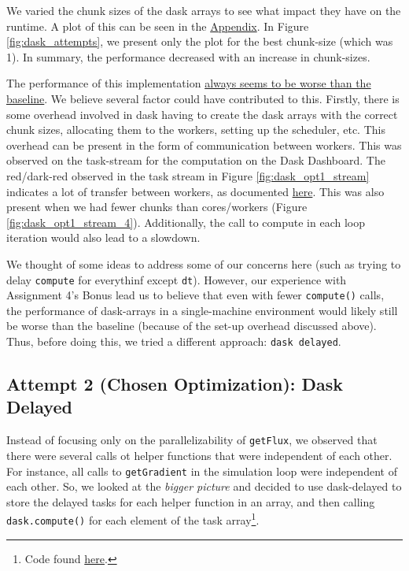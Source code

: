 \documentclass[a4paper,10pt]{article}
\begin{document}
We varied the chunk sizes of the dask arrays to see what impact they have on the runtime.
A plot of this can be seen in the \hyperref[fig:dask_opt1_chunk_size]{Appendix}.
In Figure \ref{fig:dask_attempts}, we present only the plot for the best chunk-size (which was 1).
In summary, the performance decreased with an increase in chunk-sizes.

The performance of this implementation \underline{always seems to be worse than the baseline}.
We believe several factor could have contributed to this.
Firstly, there is some overhead involved in dask having to create the dask arrays with the correct chunk sizes, allocating them to the workers, setting up the scheduler, etc.
This overhead can be present in the form of communication between workers.
This was observed on the task-stream for the computation on the Dask Dashboard.
The red/dark-red observed in the task stream in Figure \ref{fig:dask_opt1_stream} indicates a lot of transfer between workers, as documented \href{https://docs.dask.org/en/stable/dashboard.html\#task-stream}{here}.
This was also present when we had fewer chunks than cores/workers (Figure \ref{fig:dask_opt1_stream_4}).
Additionally, the call to compute in each loop iteration would also lead to a slowdown.

We thought of some ideas to address some of our concerns here (such as trying to delay \verb|compute| for everythinf except \verb|dt|).
However, our experience with Assignment 4's Bonus lead us to believe that even with fewer \verb|compute()| calls, the performance of dask-arrays in a single-machine environment would likely still be worse than the baseline (because of the set-up overhead discussed above).
Thus, before doing this, we tried a different approach: \verb|dask delayed|.

\subsection{Attempt 2 (Chosen Optimization): Dask Delayed}
Instead of focusing only on the parallelizability of \verb|getFlux|, we observed that there were several calls ot helper functions that were independent of each other.
For instance, all calls to \verb|getGradient| in the simulation loop were independent of each other.
So, we looked at the \textit{bigger picture} and decided to use dask-delayed to store the delayed tasks for each helper function in an array, and then calling \verb|dask.compute()| for each element of the task array\footnote{Code found \href{https://github.com/paulmyr/DD2358-HPC25/blob/master/10_project_rishi_paul/code/dask/finitevolume_dask_opt2.py}{here}.}.
\end{document}
